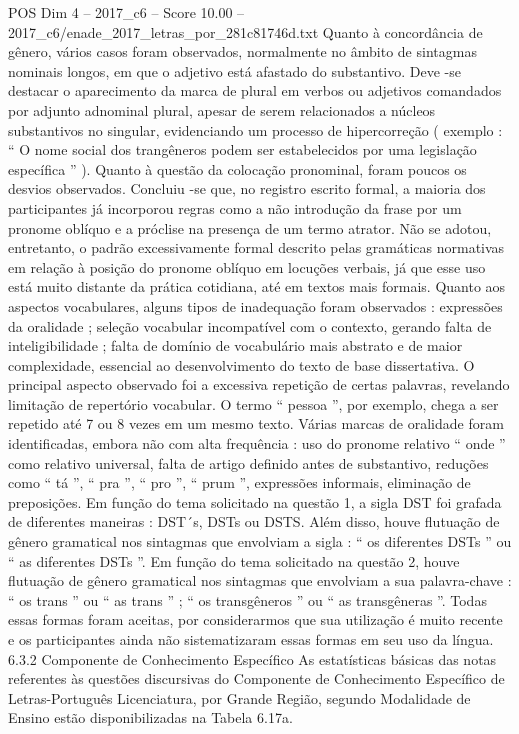 \begin{textsample}{POS Dim 4 – 2017\_c6 – Score 10.00 – 2017\_c6/enade\_2017\_letras\_por\_281c81746d.txt}
Quanto à concordância de gênero, vários casos foram observados, normalmente no âmbito de sintagmas nominais longos, em que o adjetivo está afastado do substantivo.
Deve -se destacar o aparecimento da marca de plural em verbos ou adjetivos comandados por adjunto adnominal plural, apesar de serem relacionados a núcleos substantivos no singular, evidenciando um processo de hipercorreção ( exemplo : “ O nome social dos trangêneros podem ser estabelecidos por uma legislação específica ” ).
Quanto à questão da colocação pronominal, foram poucos os desvios observados.
Concluiu -se que, no registro escrito formal, a maioria dos participantes já incorporou regras como a não introdução da frase por um pronome oblíquo e a próclise na presença de um termo atrator.
Não se adotou, entretanto, o padrão excessivamente formal descrito pelas gramáticas normativas em relação à posição do pronome oblíquo em locuções verbais, já que esse uso está muito distante da prática cotidiana, até em textos mais formais.
Quanto aos aspectos vocabulares, alguns tipos de inadequação foram observados : expressões da oralidade ; seleção vocabular incompatível com o contexto, gerando falta de inteligibilidade ; falta de domínio de vocabulário mais abstrato e de maior complexidade, essencial ao desenvolvimento do texto de base dissertativa.
O principal aspecto observado foi a excessiva repetição de certas palavras, revelando limitação de repertório vocabular.
O termo “ pessoa ”, por exemplo, chega a ser repetido até 7 ou 8 vezes em um mesmo texto.
Várias marcas de oralidade foram identificadas, embora não com alta frequência : uso do pronome relativo “ onde ” como relativo universal, falta de artigo definido antes de substantivo, reduções como “ tá ”, “ pra ”, “ pro ”, “ prum ”, expressões informais, eliminação de preposições.
Em função do tema solicitado na questão 1, a sigla DST foi grafada de diferentes maneiras : DST´s, DSTs ou DSTS.
Além disso, houve flutuação de gênero gramatical nos sintagmas que envolviam a sigla : “ os diferentes DSTs ” ou “ as diferentes DSTs ”.
Em função do tema solicitado na questão 2, houve flutuação de gênero gramatical nos sintagmas que envolviam a sua palavra-chave : “ os trans ” ou “ as trans ” ; “ os transgêneros ” ou “ as transgêneras ”.
Todas essas formas foram aceitas, por considerarmos que sua utilização é muito recente e os participantes ainda não sistematizaram essas formas em seu uso da língua. 6.3.2 Componente de Conhecimento Específico As estatísticas básicas das notas referentes às questões discursivas do Componente de Conhecimento Específico de Letras-Português Licenciatura, por Grande Região, segundo Modalidade de Ensino estão disponibilizadas na Tabela 6.17a.

\end{textsample}
